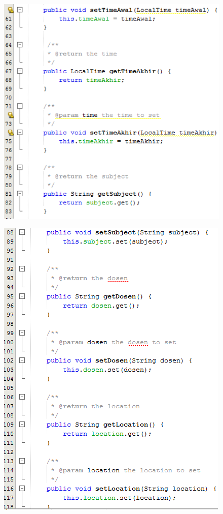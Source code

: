 \begin{enumerate}
\begin{figure}[H]
		\includegraphics[scale=0.8]{Gambar/scheduleClass2}
		\end{figure}
		\begin{figure}[H]
		\includegraphics[scale=0.8]{Gambar/scheduleClass3}

\end{figure}
\end{enumerate}
